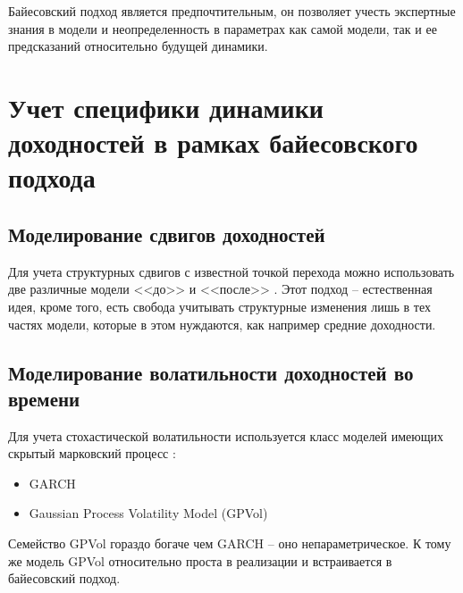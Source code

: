 Байесовский подход является предпочтительным, он позволяет учесть экспертные знания в модели и неопределенность в параметрах как самой модели, так и ее предсказаний относительно будущей динамики.
\section{Учет специфики динамики доходностей в рамках байесовского подхода}
\subsection{Моделирование сдвигов доходностей}
Для учета структурных сдвигов с известной точкой перехода можно использовать две различные модели <<до>> и <<после>> \citep{salazar1982}. Этот подход -- естественная идея, кроме того, есть свобода учитывать структурные изменения лишь в тех частях модели, которые в этом нуждаются, как например средние доходности.

\subsection{Моделирование волатильности доходностей во времени}
Для учета стохастической волатильности используется класс моделей имеющих скрытый марковский процесс \citep{ghahramani2001}:
\begin{itemize}
	\item GARCH \citep{engle1982}
	\item Gaussian Process Volatility Model (GPVol) \citep{han2016}
\end{itemize}
Семейство GPVol гораздо богаче чем GARCH -- оно непараметрическое. К тому же модель GPVol относительно проста в реализации и встраивается в байесовский подход.

